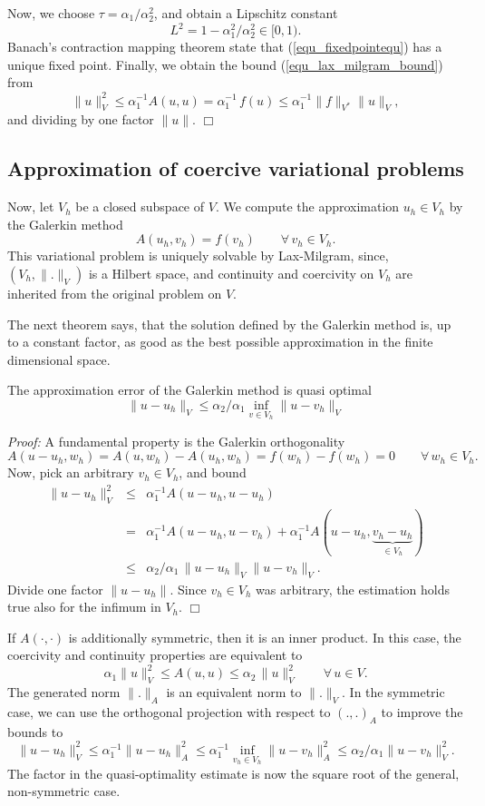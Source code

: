 Now, we choose $\tau = \alpha_1 / \alpha_2^2$, and obtain a Lipschitz constant
$$
L^2 = 1 - \alpha_1^2 / \alpha_2^2 \in [0,1).
$$
Banach's contraction mapping theorem state that (\ref{equ_fixedpointequ}) 
has a unique fixed point. Finally, we obtain the bound (\ref{equ_lax_milgram_bound}) from
$$
\| u \|_V^2 \leq \alpha_1^{-1} A(u,u) = \alpha_1^{-1} \, f(u) \leq \alpha_1^{-1} \| f\|_{V^\ast} \| u \|_V,
$$
and dividing by one factor $\|u\|$.
\hfill $\Box$

\subsection{Approximation of coercive variational problems}
Now, let $V_h$ be a closed subspace of $V$. We compute the
approximation $u_h \in V_h$ by the Galerkin method
\begin{equation}
A(u_h, v_h) = f(v_h) \qquad \forall \, v_h \in V_h.
\end{equation}
This variational problem is uniquely solvable by Lax-Milgram, 
since, $(V_h,\|.\|_V)$ is 
a Hilbert space, and continuity and coercivity on $V_h$ are inherited
from the original problem on $V$.


The next theorem says, that the solution defined by the Galerkin method is,
up to a constant factor, as good as the best possible approximation in the
finite dimensional space.

\begin{theorem}[Cea] The approximation error of the Galerkin method
is quasi optimal
$$
\| u - u_h \|_V \leq \alpha_2 / \alpha_1 \inf_{v \in V_h} \| u - v_h \|_V
$$
\end{theorem}
{\em Proof:} A fundamental property is the Galerkin orthogonality
$$
A(u-u_h, w_h) = A(u,w_h) - A(u_h, w_h) = f(w_h) - f(w_h) = 0
\qquad \forall \, w_h \in V_h.
$$
Now, pick an arbitrary $v_h \in V_h$, and bound
\begin{eqnarray*}
\| u - u_h \|_V^2 & \leq & \alpha_1^{-1} A(u-u_h, u-u_h) \\
& = & \alpha_1^{-1} A(u-u_h, u-v_h) + \alpha_1^{-1} A(u-u_h, \underbrace{v_h-u_h}_{\in V_h}) \\
& \leq &  \alpha_2 / \alpha_1 \, \| u - u_h \|_V \| u - v_h \|_V.
\end{eqnarray*}
Divide one factor $\|u - u_h\|$. Since $v_h \in V_h$ was arbitrary, the estimation
holds true also for the infimum in $V_h$.
\hfill $\Box$

\bigskip
If $A(\cdot,\cdot)$ is additionally symmetric, then it is an inner product. In this
case, the coercivity and continuity properties are equivalent to
$$
\alpha_1 \| u \|_V^2 \leq A(u,u) \leq \alpha_2 \, \| u \|_V^2
\qquad \forall \, u \in V.
$$
The generated norm $\|.\|_A$ is an equivalent norm to $\|.\|_V$. In the 
symmetric case, we can use the orthogonal projection with respect to 
$(.,.)_A$ to improve the bounds to
$$
\| u - u_h \|_V^2 \leq \alpha_1^{-1} \| u - u_h \|_A^2 \leq
        \alpha_1^{-1} \inf_{v_h \in V_h} \| u - v_h \|_A^2 \leq
        \alpha_2 / \alpha_1 \| u - v_h \|_V^2.
$$
The factor in the quasi-optimality estimate is now the square root of the
general, non-symmetric case.

